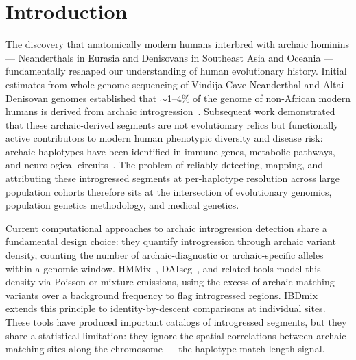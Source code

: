 \section*{Introduction}

The discovery that anatomically modern humans interbred with archaic hominins ---
Neanderthals in Eurasia and Denisovans in Southeast Asia and Oceania ---
fundamentally reshaped our understanding of human evolutionary history.
Initial estimates from whole-genome sequencing of Vindija Cave Neanderthal
and Altai Denisovan genomes established that $\sim$1--4\% of the genome of
non-African modern humans is derived from archaic
introgression~\citep{green2010draft, reich2010genetic, prufer2014complete}.
Subsequent work demonstrated that these archaic-derived segments are not
evolutionary relics but functionally active contributors to modern human
phenotypic diversity and disease risk: archaic haplotypes have been identified
in immune genes, metabolic pathways, and neurological
circuits~\citep{sankararaman2014genomic, vernot2014resurrecting,
dannemann2017contribution, browning2018ancestry}.
The problem of reliably detecting, mapping, and attributing these introgressed
segments at per-haplotype resolution across large population cohorts therefore
sits at the intersection of evolutionary genomics, population genetics methodology,
and medical genetics.

Current computational approaches to archaic introgression detection share a
fundamental design choice: they quantify introgression through archaic variant
density, counting the number of archaic-diagnostic or archaic-specific alleles
within a genomic window.
HMMix~\citep{skov2018detecting}, DAIseg~\citep{planche2024daiseg}, and related tools
model this density via Poisson or mixture emissions, using the excess of
archaic-matching variants over a background frequency to flag introgressed regions.
IBDmix~\citep{chen2020identifying} extends this principle to identity-by-descent
comparisons at individual sites.
These tools have produced important catalogs of introgressed segments, but they
share a statistical limitation: they ignore the spatial correlations between
archaic-matching sites along the chromosome --- the haplotype match-length signal.

